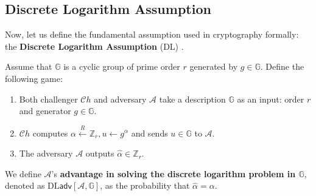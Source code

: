 \documentclass[../lecture-notes-148x210.tex]{subfiles}
\begin{document}




\subsection{Discrete Logarithm Assumption}

Now, let us define the fundamental assumption used in cryptography formally: the \textbf{Discrete Logarithm Assumption} (DL) \cite[chapter 16]{Dan_Boneh_2023}.

\begin{definition}
    Assume that $\mathbb{G}$ is a cyclic group of prime order $r$ generated by $g \in \mathbb{G}$. Define the 
    following game:
    \begin{enumerate}
        \item Both challenger $\mathcal{C}h$ and adversary $\mathcal{A}$ take a description $\mathbb{G}$ as an 
        input: order $r$ and generator $g \in \mathbb{G}$.
        \item $\mathcal{C}h$ computes $\alpha \xleftarrow{R} \mathbb{Z}_r, u \gets g^{\alpha}$ and sends 
        $u \in \mathbb{G}$ to $\mathcal{A}$.
        \item The adversary $\mathcal{A}$ outputs $\hat{\alpha} \in \mathbb{Z}_r$.
    \end{enumerate}

    We define $\mathcal{A}$'s \textbf{advantage in solving the discrete logarithm problem in $\mathbb{G}$}, 
    denoted as $\text{DL}\mathsf{adv}[\mathcal{A},\mathbb{G}]$, as the probability that $\hat{\alpha} = \alpha$.
\end{definition}
\end{document}
